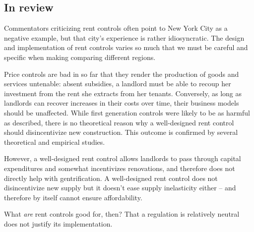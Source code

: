 \subsection{In review}

Commentators criticizing rent controls often point to New York City as a negative example, but that city's experience is rather idiosyncratic. The design and implementation of rent controls varies so much that we must be careful and specific when making comparing different regions.

Price controls are bad in so far that they render the production of goods and services untenable: absent subsidies, a landlord must be able to recoup her investment from the rent she extracts from her tenants. Conversely, as long as landlords can recover increases in their costs over time, their business models should be unaffected. While first generation controls were likely to be as harmful as described, there is no theoretical reason why a well-designed rent control should disincentivize new construction. This outcome is confirmed by several theoretical and empirical studies.

However, a well-designed rent control allows landlords to pass through capital expenditures and somewhat incentivizes renovations, and therefore does not directly help with gentrification. A well-designed rent control does not disincentivize new supply but it doesn't ease supply inelasticity either -- and therefore by itself cannot ensure affordability.


What \emph{are} rent controls good for, then? That a regulation is relatively neutral does not justify its implementation.
